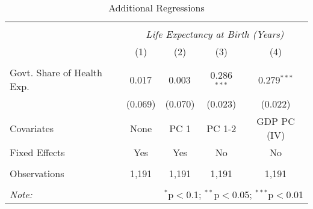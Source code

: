 \begin{table}[!htbp] \centering
  \caption{Additional Regressions \label{additional_regs}}
\begin{tabular}{@{\extracolsep{5pt}}lcccc}
\\[-1.8ex]\hline
\hline \\[-1.8ex]
& \multicolumn{4}{c}{\textit{Life Expectancy at Birth (Years)}} \
\cr \
\\[-1.8ex] & (1) & (2) & (3) & (4) \\
\hline \\[-1.8ex]
 Govt. Share of Health Exp. & 0.017$^{}$ & 0.003$^{}$ & 0.286$^{***}$ & 0.279$^{***}$ \\
  & (0.069) & (0.070) & (0.023) & (0.022) \\
 Covariates & None & PC 1 & PC 1-2 & GDP PC (IV) \\
 Fixed Effects & Yes & Yes & No & No \\
\hline \\[-1.8ex]
 Observations & 1,191 & 1,191 & 1,191 & 1,191 \\
\hline
\hline \\[-1.8ex]
\textit{Note:} & \multicolumn{4}{r}{$^{*}$p$<$0.1; $^{**}$p$<$0.05; $^{***}$p$<$0.01} \\
\end{tabular}
\end{table}